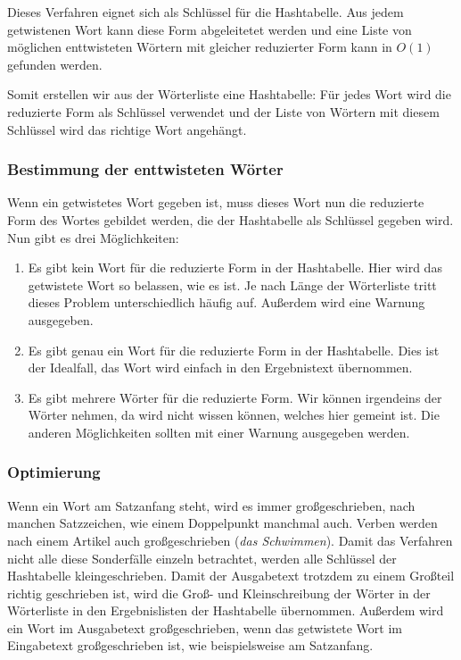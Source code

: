 \documentclass[a4paper,10pt,ngerman]{scrartcl}
\begin{document}
Dieses Verfahren eignet sich als Schlüssel für die Hashtabelle. Aus jedem getwistenen Wort kann diese Form abgeleitetet werden und eine Liste von möglichen enttwisteten Wörtern mit gleicher reduzierter Form kann in $O(1)$ gefunden werden.

Somit erstellen wir aus der Wörterliste eine Hashtabelle: Für jedes Wort wird die reduzierte Form als Schlüssel verwendet und der Liste von Wörtern mit diesem Schlüssel wird das richtige Wort angehängt.

\subsubsection{Bestimmung der enttwisteten Wörter}
Wenn ein getwistetes Wort gegeben ist, muss dieses Wort nun die reduzierte Form des Wortes gebildet werden, die der Hashtabelle als Schlüssel gegeben wird. Nun gibt es drei Möglichkeiten:
\begin{enumerate}
  \item Es gibt kein Wort für die reduzierte Form in der Hashtabelle. Hier wird das getwistete Wort so belassen, wie es ist. Je nach Länge der Wörterliste tritt dieses Problem unterschiedlich häufig auf. Außerdem wird eine Warnung ausgegeben.
  \item Es gibt genau ein Wort für die reduzierte Form in der Hashtabelle. Dies ist der Idealfall, das Wort wird einfach in den Ergebnistext übernommen.
  \item Es gibt mehrere Wörter für die reduzierte Form. Wir können irgendeins der Wörter nehmen, da wird nicht wissen können, welches hier gemeint ist. Die anderen Möglichkeiten sollten mit einer Warnung ausgegeben werden.
\end{enumerate}

\subsubsection{Optimierung}
Wenn ein Wort am Satzanfang steht, wird es immer großgeschrieben, nach manchen Satzzeichen, wie einem Doppelpunkt manchmal auch. Verben werden nach einem Artikel auch großgeschrieben (\textit{das Schwimmen}). Damit das Verfahren nicht alle diese Sonderfälle einzeln betrachtet, werden alle Schlüssel der Hashtabelle kleingeschrieben. Damit der Ausgabetext trotzdem zu einem Großteil richtig geschrieben ist, wird die Groß- und Kleinschreibung der Wörter in der Wörterliste in den Ergebnislisten der Hashtabelle übernommen. Außerdem wird ein Wort im Ausgabetext großgeschrieben, wenn das getwistete Wort im Eingabetext großgeschrieben ist, wie beispielsweise am Satzanfang.
\end{document}
